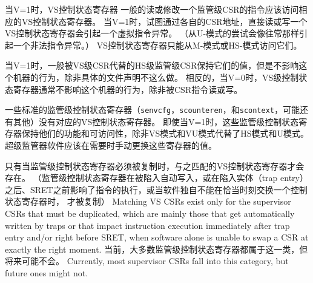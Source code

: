 当V=1时，VS控制状态寄存器
一般的读或修改一个监管级CSR的指令应该访问相应的VS控制状态寄存器。
当V=1时，试图通过各自的CSR地址，直接读或写一个VS控制状态寄存器会引起一个虚拟指令异常。
（从U-模式的尝试会像往常那样引起一个非法指令异常。）
VS控制状态寄存器只能从M-模式或HS-模式访问它们。

当V=1时，一般被VS级CSR代替的HS级监管级CSR保持它们的值，但是不影响这个机器的行为，除非具体的文件声明不这么做。
相反的，当V=0时，VS级控制状态寄存器通常不影响这个机器的行为，除非被CSR指令读或写。

一些标准的监管级控制状态寄存器（{\tt senvcfg}，{\tt scounteren}，和{\tt scontext}，可能还有其他）没有对应的VS控制状态寄存器。
即使当V=1时，这些监管级控制状态寄存器保持他们的功能和可访问性，除非VS模式和VU模式代替了HS模式和U模式。
超级监管器软件应该在需要时手动更换这些寄存器的值。

\begin{commentary}
  只有当监管级控制状态寄存器必须被复制时，与之匹配的VS控制状态寄存器才会存在。
  （监管级控制状态寄存器在被陷入自动写入，或在陷入实体（trap entry）之后、SRET之前影响了指令的执行，或当软件独自不能在恰当时刻交换一个控制状态寄存器时，
  才被复制）
Matching VS CSRs exist only for the supervisor CSRs that must be
duplicated, which are mainly those that get automatically written by
traps or that impact instruction execution immediately after trap entry
and/or right before SRET, when software alone is unable to swap a CSR at
exactly the right moment.
  当前，大多数监管级控制状态寄存器都属于这一类，但将来可能不会。
Currently, most supervisor CSRs fall into this category, but future ones
might not.
\end{commentary}

